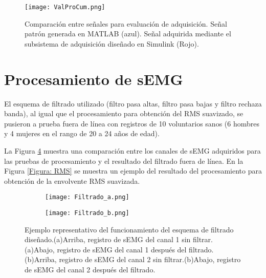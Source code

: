 \begin{figure}[htbp]
	\centering
	\texttt{[image: ValProCum.png]}
	\caption[Comparación entre señales para evaluación de adquisición.]{Comparación entre señales para evaluación de adquisición. Señal patrón generada en MATLAB\textregistered \; (azul). Señal adquirida mediante el subsistema de adquisición diseñado en Simulink\textregistered \; (Rojo).}
	\label{Figura: ValProCum}
\end{figure}

\newpage
\section{Procesamiento de sEMG}
El esquema de filtrado utilizado (filtro pasa altas, filtro pasa bajas y filtro rechaza banda), al igual que el procesamiento para obtención del RMS suavizado, se pusieron a prueba fuera de línea con registros de 10 voluntarios sanos (6 hombres y 4 mujeres en el rango de 20 a 24 años de edad).

La Figura \ref{Figura: Filtrado} muestra una comparación entre los canales de sEMG adquiridos para las pruebas de procesamiento y el resultado del filtrado fuera de línea. En la Figura \ref{Figura: RMS} se muestra un ejemplo del resultado del procesamiento para obtención de la envolvente RMS suavizada.


\begin{figure}[htbp]
	\centering
	\begin{subfigure}[htbp]{0.45\textwidth}
		\texttt{[image: Filtrado\_a.png]}
		\caption{}
		\label{Figura: Filtrado_a}
	\end{subfigure}
	\hfill
	\begin{subfigure}[htbp]{0.45\textwidth}
		\texttt{[image: Filtrado\_b.png]}
		\caption{}
		\label{Figura: Filtrado_b}
	\end{subfigure}	
	\caption[Ejemplo representativo del funcionamiento del esquema de filtrado diseñado]{Ejemplo representativo del funcionamiento del esquema de filtrado diseñado.(a)Arriba, registro de sEMG del canal 1 sin filtrar.(a)Abajo, registro de sEMG del canal 1 después del filtrado.(b)Arriba, registro de sEMG del canal 2 sin filtrar.(b)Abajo, registro de sEMG del canal 2 después del filtrado.}
	\label{Figura: Filtrado}
\end{figure}


